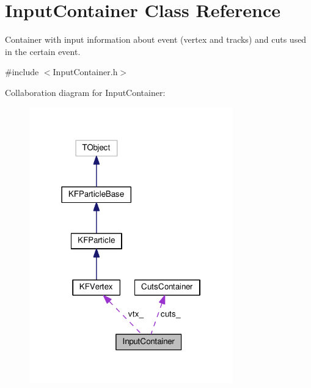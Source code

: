 \hypertarget{classInputContainer}{}\section{Input\+Container Class Reference}
\label{classInputContainer}


Container with input information about event (vertex and tracks) and cuts used in the certain event.  




{\ttfamily \#include $<$Input\+Container.\+h$>$}



Collaboration diagram for Input\+Container\+:
\nopagebreak
\begin{figure}[H]
\begin{center}
\leavevmode
\includegraphics[width=250pt]{classInputContainer__coll__graph}
\end{center}
\end{figure}

